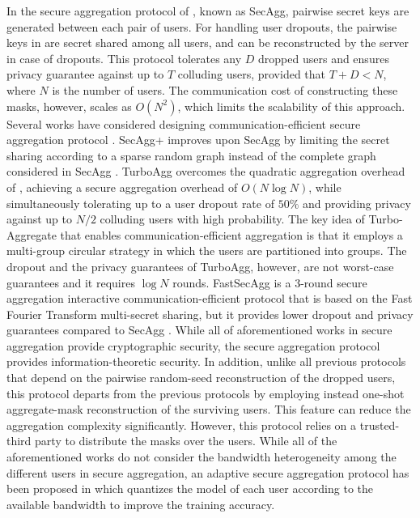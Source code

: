 In the secure aggregation protocol of  \cite{bonawitz2017practical}, known as SecAgg, pairwise secret keys are generated between each pair of users. For handling user dropouts, the pairwise keys in \cite{bonawitz2017practical} are secret shared among all users, and can be reconstructed by the server in case of dropouts. This protocol tolerates any $D$ dropped users and ensures privacy guarantee against up to $T$ colluding users, provided that $T+D<N$, where $N$ is the number of users. The communication cost of constructing these masks, however, scales as $O(N^2)$, which limits the scalability of this approach. Several works have considered designing communication-efficient secure aggregation protocol \cite{so2021turbo,kadhe2020fastsecagg,zhao2021information,elkordy2020secure,bell2020secure}. SecAgg+ \cite{bell2020secure} improves upon SecAgg \cite{bonawitz2017practical} by limiting the secret sharing according to a sparse random graph instead of the complete graph considered in SecAgg  \cite{bonawitz2017practical}. TurboAgg \cite{so2021turbo} overcomes the quadratic aggregation overhead of \cite{bonawitz2017practical}, achieving a secure aggregation overhead of $O(N\log N)$, while simultaneously tolerating up to a user dropout rate of $50\%$ and providing privacy against up to $N/2$ colluding users with high probability. The key idea of Turbo-Aggregate that enables communication-efficient aggregation is that it employs a multi-group circular strategy in which the users are partitioned into groups. The dropout and the privacy guarantees of TurboAgg, however, are not worst-case guarantees and it requires $\log N$ rounds.  FastSecAgg \cite{kadhe2020fastsecagg} is a $3$-round secure aggregation interactive communication-efficient protocol that is based on the Fast Fourier Transform multi-secret sharing, but it provides lower dropout and privacy guarantees compared to SecAgg \cite{bonawitz2017practical}. While all of aforementioned works in secure aggregation provide cryptographic security, the secure aggregation protocol \cite{zhao2021information} provides information-theoretic security. In addition, unlike all previous protocols that depend on the pairwise random-seed reconstruction of the dropped users, this protocol departs from the previous protocols by employing instead one-shot aggregate-mask reconstruction of the surviving users. This feature can reduce the aggregation complexity significantly. However, this protocol relies on a trusted-third party to distribute the masks over the users.  While all of the aforementioned works do not consider the bandwidth heterogeneity among the different users in secure aggregation, an adaptive secure aggregation protocol has been proposed in \cite{elkordy2020secure} which quantizes the model of each user according to the available bandwidth to improve the training accuracy.
 
